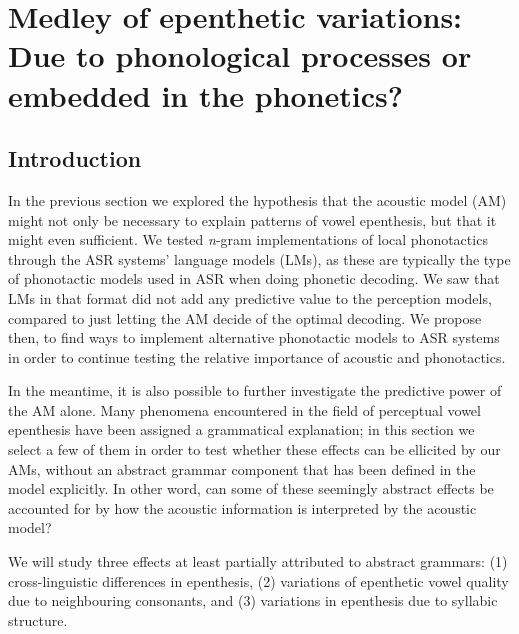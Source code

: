 {%


\newpage
\section{Medley of epenthetic variations: \\ Due to phonological processes or embedded in the phonetics?} \label{3-medley}

\subsection{Introduction}
In the previous section we explored the hypothesis that the acoustic model (AM) might not only be necessary to explain patterns of vowel epenthesis, but that it might even sufficient. We tested \textit{n}-gram implementations of local phonotactics through the ASR systems' language models (LMs), as these are typically the type of phonotactic models used in ASR when doing phonetic decoding. We saw that LMs in that format did not add any predictive value to the perception models, compared to just letting the AM decide of the optimal decoding. We propose then, to find ways to implement alternative phonotactic models to ASR systems in order to continue testing the relative importance of acoustic and phonotactics.

In the meantime, it is also possible to further investigate the predictive power of the AM alone. Many phenomena encountered in the field of perceptual vowel epenthesis have been assigned a grammatical explanation; in this section we select a few of them in order to test whether these effects can be ellicited by our AMs, without an abstract grammar component that has been defined in the model explicitly. In other word, can some of these seemingly abstract effects be accounted for by how the acoustic information is interpreted by the acoustic model?

We will study three effects at least partially attributed to abstract grammars: (1) cross-linguistic differences in epenthesis, (2) variations of epenthetic vowel quality due to neighbouring consonants, and (3) variations in epenthesis due to syllabic structure.

}
